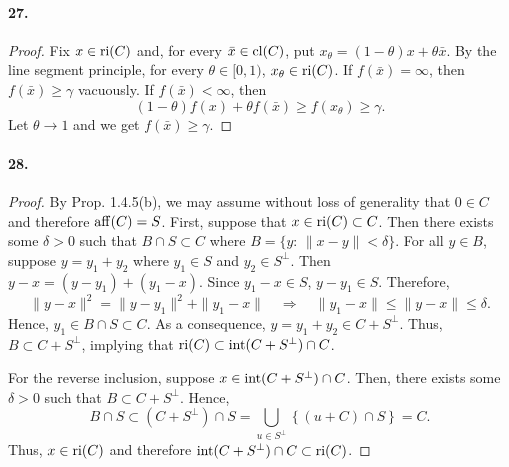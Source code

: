   \paragraph{27.}
  \begin{proof}
    Fix $x\in\operatorname{ri}(C)$ and, for every $\bar{x}\in\operatorname{cl}(C)$, put $x_\theta=(1-
    \theta)x+\theta\bar{x}$. By the line segment principle, for every $\theta
    \in[0,1)$, $x_\theta\in\operatorname{ri}(C)$. If $f(\bar{x})=\infty$, then $f(\bar{x})
    \ge\gamma$ vacuously. If $f(\bar{x})<\infty$, then 
    \[
      (1-\theta)f(x)+\theta f(\bar{x})\ge f(x_\theta)\ge \gamma.
    \]
    Let $\theta\to 1$ and we get $f(\bar{x})\ge\gamma$.
  \end{proof}
  
  \paragraph{28.}
  \begin{proof}
    By Prop. 1.4.5(b), we may assume without loss of generality that $0\in C$
    and therefore $\operatorname{aff}(C)=S$. First, suppose that $x\in\operatorname{ri}(C)\subset C$. Then
    there exists some $\delta>0$ such that $B\cap S\subset C$ where $B=\{y:\,
    \|x-y\|<\delta\}$. For all $y\in B$, suppose $y=y_1+y_2$ where $y_1\in S$
    and $y_2\in S^\perp$. Then $y-x=(y-y_1)+(y_1-x)$. Since $y_1-x\in S$, $y
    -y_1\in S$. Therefore, 
    \[
      \|y-x\|^2=\|y-y_1\|^2+\|y_1-x\|
      \quad\Rightarrow\quad
      \|y_1-x\|\le \|y-x\|\le \delta.
    \]
    Hence, $y_1\in B\cap S\subset C$. As a consequence, $y=y_1+y_2\in C+
    S^\perp$. Thus, $B\subset C+S^\perp$, implying that $\operatorname{ri}(C)\subset\operatorname{int}(C+
    S^\perp)\cap C$.\par
    For the reverse inclusion, suppose $x\in\operatorname{int}(C+S^\perp)\cap C$. Then, 
    there exists some $\delta>0$ such that $B\subset C+S^\perp$. Hence,
    \[
      B\cap S\subset(C+S^\perp)\cap S
      =\bigcup_{u\in S^\perp}\left\{(u+C)\cap S\right\}
      =C.
    \]
    Thus, $x\in\operatorname{ri}(C)$ and therefore $\operatorname{int}(C+S^\perp)\cap C\subset\operatorname{ri}(C)$.
  \end{proof}
  
